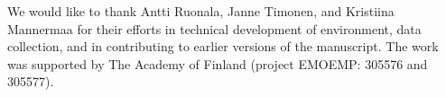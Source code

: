 \documentclass[manuscript, review = false, screen]{acmart}
\begin{document}






%
\begin{acks}
We would like to thank Antti Ruonala, Janne Timonen, and Kristiina Mannermaa for their efforts in technical development of environment, data collection, and in contributing to earlier versions of the manuscript. The work was supported by The Academy of Finland (project EMOEMP: 305576 and 305577). 

\end{acks}
\end{document}
